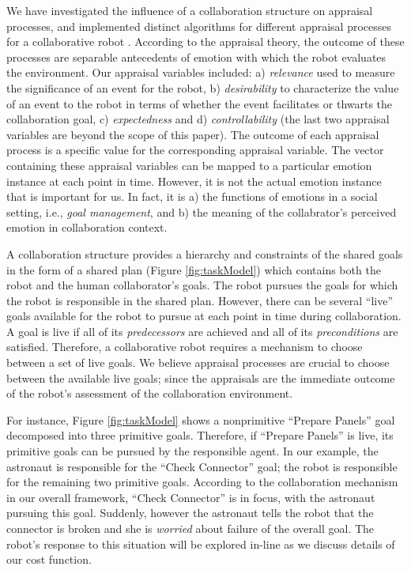 \documentclass[conference]{IEEEtran}
\begin{document}
We have investigated the influence of a collaboration structure on
appraisal processes, and implemented distinct algorithms for different
appraisal processes for a collaborative robot \cite{shayganfar:appraisal}.
According to the appraisal theory, the outcome of these processes are separable
antecedents of emotion with which the robot evaluates the environment. Our
appraisal variables included: a) \textit{relevance} used to measure the
significance of an event for the robot, b) \textit{desirability} to characterize
the value of an event to the robot in terms of whether the event facilitates or
thwarts the collaboration goal, c) \textit{expectedness} and d)
\textit{controllability} (the last two appraisal variables are beyond the scope
of this paper). The outcome of each appraisal process is a specific value for
the corresponding appraisal variable. The vector containing these appraisal
variables can be mapped to a particular emotion instance at each point in time.
However, it is not the actual emotion instance that is important for us. In
fact, it is a) the functions of emotions in a social setting, i.e., \textit{goal
management}, and b) the meaning of the collabrator's perceived emotion in
collaboration context.

A collaboration structure provides a hierarchy and constraints of the shared
goals in the form of a shared plan (Figure \ref{fig:taskModel}) which contains
both the robot and the human collaborator's goals. The robot pursues the goals
for which the robot is responsible in the shared plan. However, there can be
several ``live'' goals available for the robot to pursue at each point in time
during collaboration. A goal is live if all of its \textit{predecessors} are
achieved and all of its \textit{preconditions} are satisfied. Therefore, a
collaborative robot requires a mechanism to choose between a set of live goals.
We believe appraisal processes are crucial to choose between the available live
goals; since the appraisals are the immediate outcome of the robot's assessment
of the collaboration environment.

For instance, Figure \ref{fig:taskModel} shows a nonprimitive ``Prepare Panels''
goal decomposed into three primitive goals. Therefore, if ``Prepare Panels'' is
live, its primitive goals can be pursued by the responsible agent. In our
example, the astronaut is responsible for the ``Check Connector'' goal; the
robot is responsible for the remaining two primitive goals. According to the
collaboration mechanism in our overall framework, ``Check Connector'' is in
focus, with the astronaut pursuing this goal. Suddenly, however the astronaut
tells the robot that the connector is broken and she is \textit{worried} about
failure of the overall goal. The robot's response to this situation will be
explored in-line as we discuss details of our cost function.
\end{document}
